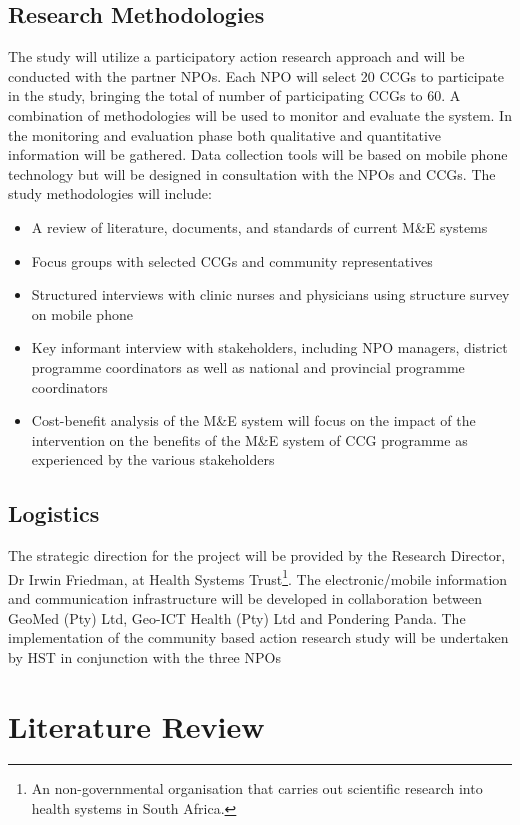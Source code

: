 \subsection*{Research Methodologies}

The study will utilize a participatory action research approach and 
will be conducted with the partner NPOs. Each NPO will select 20 
CCGs to participate in the study, bringing the total of number of 
participating CCGs to 60. A combination of methodologies will be 
used to monitor and evaluate the system. In the monitoring and 
evaluation phase both qualitative and quantitative information 
will be gathered. Data collection tools will be based on mobile 
phone technology but will be designed in consultation with 
the NPOs and CCGs. The study methodologies will include:
\begin{itemize}
\item A review of literature, documents, and standards of current M\&E systems
\item Focus groups with selected CCGs and community representatives  
\item Structured interviews with clinic nurses and physicians using 
structure survey on mobile phone
\item Key informant interview with stakeholders, including NPO managers, 
district programme coordinators as well as national and provincial 
programme coordinators 
\item Cost-benefit analysis of the M\&E system will 
focus on the impact of the intervention on the benefits of the M\&E 
system of CCG programme as experienced by the various stakeholders
\end{itemize}

\subsection*{Logistics}

The strategic direction for the project will be provided 
by the Research Director, Dr Irwin Friedman, at Health Systems 
Trust\footnote{An non-governmental organisation that carries out scientific 
research into health systems in South Africa.}.  The electronic/mobile 
information and communication infrastructure will be developed in 
collaboration between GeoMed (Pty) Ltd, Geo-ICT Health (Pty) Ltd and 
Pondering Panda. The implementation of the community based 
action research study will be undertaken by HST in conjunction with 
the three NPOs 

\section*{Literature Review}

